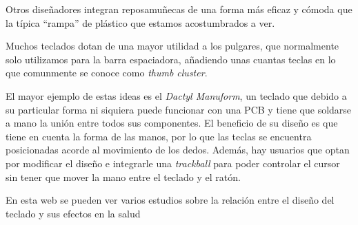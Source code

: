 Otros diseñadores integran reposamuñecas de una forma más eficaz y cómoda que la típica ``rampa'' de plástico que estamos acostumbrados a ver.

Muchos teclados dotan de una mayor utilidad a los pulgares, que normalmente solo utilizamos para la barra espaciadora, añadiendo unas cuantas teclas en lo que comunmente se conoce como \textit{thumb cluster}.

El mayor ejemplo de estas ideas es el \textit{Dactyl Manuform}, un teclado que debido a su particular forma ni siquiera puede funcionar con una PCB\cite{pcb} y tiene que soldarse a mano la unión entre todos sus componentes. El beneficio de su diseño es que tiene en cuenta la forma de las manos, por lo que las teclas se encuentra posicionadas acorde al movimiento de los dedos. Además, hay usuarios que optan por modificar el diseño e integrarle una \textit{trackball} para poder controlar el cursor sin tener que mover la mano entre el teclado y el ratón.

\hr
En esta web\cite{paper} se pueden ver varios estudios sobre la relación entre el diseño del teclado y sus efectos en la salud
